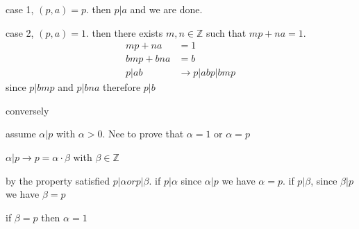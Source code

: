 \documentclass[letterpaper]{article}
\begin{document}
case 1, $(p,a)=p$. then $p|a$ and we are done.

case 2, $(p,a)=1$. then there exists $m,n\in\mathbb{Z}$ such that $mp+na=1$.
\begin{align*}
  mp+na&=1\\
  bmp+bna&=b\\
  p|ab&\rightarrow p|ab
  p|bmp
\end{align*}
since $p|bmp$ and $p|bna$ therefore $p|b$

conversely

assume $\alpha|p$ with $\alpha>0$. Nee to prove that $\alpha=1$ or $\alpha=p$

$\alpha|p\rightarrow p=\alpha\cdot\beta$ with  $\beta\in\mathbb{Z}$

by the property satisfied $p|\alpha or p|\beta$. if $p|\alpha$ since $\alpha|p$ we have $\alpha=p$. if $p|\beta$, since $\beta|p$ we have $\beta=p$

if $\beta=p$ then $\alpha=1$
\end{document}
